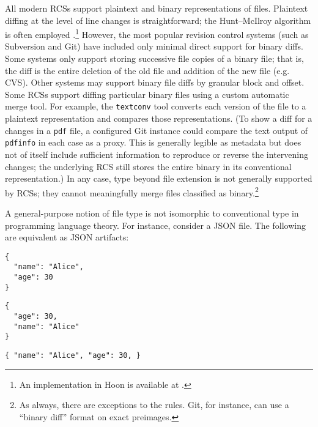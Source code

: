 \documentclass[twoside]{article}
\begin{document}
All modern RCSs support plaintext and binary representations of files.  Plaintext diffing at the level of line changes is straightforward; the Hunt–McIlroy algorithm is often employed \citep{Hunt1976}.\footnote{An implementation in Hoon is available at .}  However, the most popular revision control systems (such as Subversion and Git) have included only minimal direct support for binary diffs.  Some systems only support storing successive file copies of a binary file; that is, the diff is the entire deletion of the old file and addition of the new file (e.g. CVS).  Other systems may support binary file diffs by granular block and offset.  Some RCSs support diffing particular binary files using a custom automatic merge tool.  For example, the \texttt{textconv} tool converts each version of the file to a plaintext representation and compares those representations.  (To show a diff for a changes in a \texttt{pdf} file, a configured Git instance could compare the text output of \texttt{pdfinfo} in each case as a proxy.  This is generally legible as metadata but does not of itself include sufficient information to reproduce or reverse the intervening changes; the underlying RCS still stores the entire binary in its conventional representation.)  In any case, type beyond file extension is not generally supported by RCSs; they cannot meaningfully merge files classified as binary.\footnote{As always, there are exceptions to the rules.  Git, for instance, can use a “binary diff” format on exact preimages.}

A general-purpose notion of file type is not isomorphic to conventional type in programming language theory.  For instance, consider a JSON file.  The following are equivalent as JSON artifacts:

\begin{lstlisting}
{
  "name": "Alice",
  "age": 30
}
\end{lstlisting}

\begin{lstlisting}
{
  "age": 30,
  "name": "Alice"
}
\end{lstlisting}

\begin{lstlisting}
{ "name": "Alice", "age": 30, }
\end{lstlisting}
\end{document}
